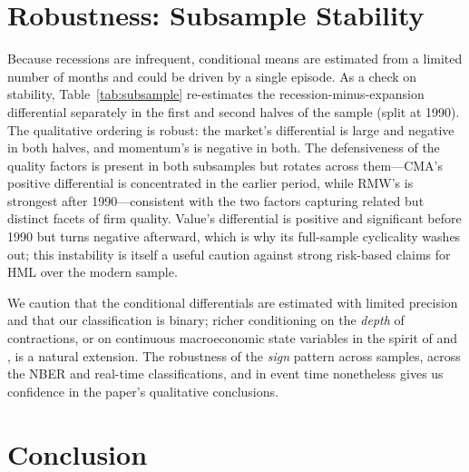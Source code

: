 \documentclass[12pt]{article}
\begin{document}
\section{Robustness: Subsample Stability}
\label{sec:robust}

Because recessions are infrequent, conditional means are estimated from a
limited number of months and could be driven by a single episode. As a check on
stability, Table~\ref{tab:subsample} re-estimates the recession-minus-expansion
differential separately in the first and second halves of the sample (split at
1990). The qualitative ordering is robust: the market's differential is large
and negative in both halves, and momentum's is negative in both. The
defensiveness of the quality factors is present in both subsamples but rotates
across them---CMA's positive differential is concentrated in the earlier period,
while RMW's is strongest after 1990---consistent with the two factors capturing
related but distinct facets of firm quality. Value's differential is positive
and significant before 1990 but turns negative afterward, which is why its
full-sample cyclicality washes out; this instability is itself a useful caution
against strong risk-based claims for HML over the modern sample.

We caution that the conditional differentials are estimated with limited
precision and that our classification is binary; richer conditioning on the
\emph{depth} of contractions, or on continuous macroeconomic state variables in
the spirit of \citet{lettau2001resurrecting} and \citet{henkel2011conditional},
is a natural extension. The robustness of the \emph{sign} pattern across
samples, across the NBER and real-time classifications, and in event time
nonetheless gives us confidence in the paper's qualitative conclusions.

\begin{table}[t]
\centering
\caption{\textbf{Subsample stability of the recession differential.} Annualized
recession-minus-expansion differential (\%) for each factor, estimated separately
over 1963--1989 and 1990--2026, with Newey--West $t$-statistics in parentheses.}
\label{tab:subsample}
\small

\end{table}

\section{Conclusion}
\label{sec:conclusion}
\end{document}
